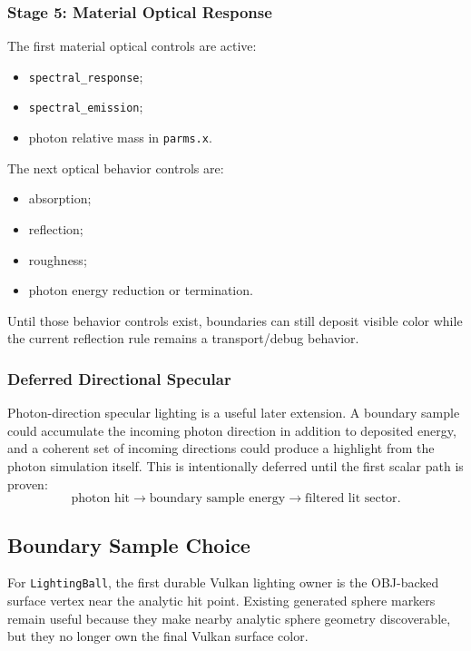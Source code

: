 \subsubsection{Stage 5: Material Optical Response}

The first material optical controls are active:
\begin{itemize}
    \item \texttt{spectral\_response};
    \item \texttt{spectral\_emission};
    \item photon relative mass in \texttt{parms.x}.
\end{itemize}

The next optical behavior controls are:
\begin{itemize}
    \item absorption;
    \item reflection;
    \item roughness;
    \item photon energy reduction or termination.
\end{itemize}

Until those behavior controls exist, boundaries can still deposit visible
color while the current reflection rule remains a transport/debug behavior.

\subsubsection{Deferred Directional Specular}

Photon-direction specular lighting is a useful later extension.  A boundary
sample could accumulate the incoming photon direction in addition to deposited
energy, and a coherent set of incoming directions could produce a highlight
from the photon simulation itself.  This is intentionally deferred until the
first scalar path is proven:
\[
    \textrm{photon hit}
    \rightarrow
    \textrm{boundary sample energy}
    \rightarrow
    \textrm{filtered lit sector}.
\]

\subsection{Boundary Sample Choice}

For \texttt{LightingBall}, the first durable Vulkan lighting owner is the
OBJ-backed surface vertex near the analytic hit point.  Existing generated
sphere markers remain useful because they make nearby analytic sphere geometry
discoverable, but they no longer own the final Vulkan surface color.

